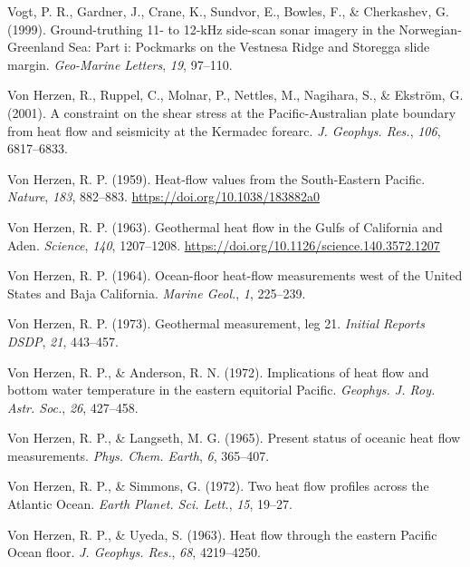 \documentclass[draft,linenumbers]{agujournal2018}
\begin{document}
\leavevmode{}%
Vogt, P. R., Gardner, J., Crane, K., Sundvor, E., Bowles, F., \&
Cherkashev, G. (1999). Ground-truthing 11- to 12-kHz side-scan sonar
imagery in the {Norwegian-Greenland Sea}: Part i: Pockmarks on the
{Vestnesa Ridge and Storegga} slide margin. \emph{Geo-Marine Letters},
\emph{19}, 97--110.

\leavevmode{}%
Von Herzen, R., Ruppel, C., Molnar, P., Nettles, M., Nagihara, S., \&
Ekström, G. (2001). A constraint on the shear stress at the
{Pacific-Australian} plate boundary from heat flow and seismicity at the
{Kermadec} forearc. \emph{J. Geophys. Res.}, \emph{106}, 6817--6833.

\leavevmode{}%
Von Herzen, R. P. (1959). Heat-flow values from the {South-Eastern
Pacific}. \emph{Nature}, \emph{183}, 882--883.
\url{https://doi.org/10.1038/183882a0}

\leavevmode{}%
Von Herzen, R. P. (1963). Geothermal heat flow in the {Gulfs of
California and Aden}. \emph{Science}, \emph{140}, 1207--1208.
\url{https://doi.org/10.1126/science.140.3572.1207}

\leavevmode{}%
Von Herzen, R. P. (1964). Ocean-floor heat-flow measurements west of the
{United States and Baja California}. \emph{Marine Geol.}, \emph{1},
225--239.

\leavevmode{}%
Von Herzen, R. P. (1973). Geothermal measurement, leg 21. \emph{Initial
Reports DSDP}, \emph{21}, 443--457.

\leavevmode{}%
Von Herzen, R. P., \& Anderson, R. N. (1972). Implications of heat flow
and bottom water temperature in the eastern equitorial {Pacific}.
\emph{Geophys. J. Roy. Astr. Soc.}, \emph{26}, 427--458.

\leavevmode{}%
Von Herzen, R. P., \& Langseth, M. G. (1965). Present status of oceanic
heat flow measurements. \emph{Phys. Chem. Earth}, \emph{6}, 365--407.

\leavevmode{}%
Von Herzen, R. P., \& Simmons, G. (1972). Two heat flow profiles across
the {Atlantic Ocean}. \emph{Earth Planet. Sci. Lett.}, \emph{15},
19--27.

\leavevmode{}%
Von Herzen, R. P., \& Uyeda, S. (1963). Heat flow through the eastern
{Pacific Ocean} floor. \emph{J. Geophys. Res.}, \emph{68}, 4219--4250.
\end{document}
